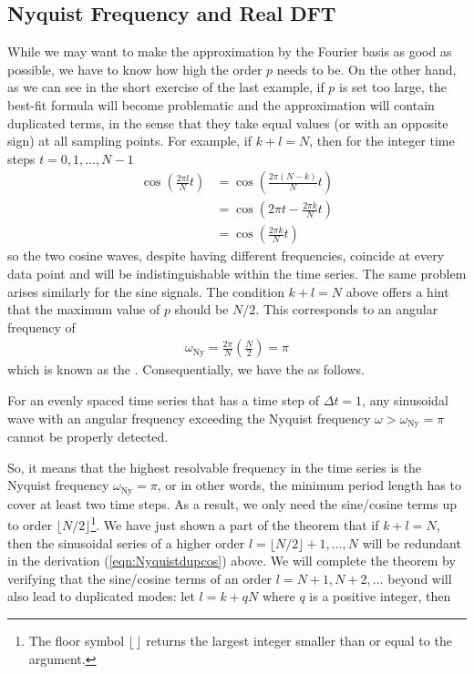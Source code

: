 \subsection{Nyquist Frequency and Real DFT}

While we may want to make the approximation by the Fourier basis as good as possible, we have to know how high the order $p$ needs to be. On the other hand, as we can see in the short exercise of the last example, if $p$ is set too large, the best-fit formula will become problematic and the approximation will contain duplicated terms, in the sense that they take equal values (or with an opposite sign) at all sampling points. For example, if $k + l = N$, then for the integer time steps $t = 0, 1, \ldots, N-1$
\begin{align}
\cos(\frac{2\pi l}{N} t) &= \cos(\frac{2\pi (N-k)}{N} t) \nonumber \\
&= \cos(2\pi t - \frac{2\pi k}{N} t) \nonumber \\
&= \cos(\frac{2\pi k}{N} t) \label{eqn:Nyquistdupcos}
\end{align}
so the two cosine waves, despite having different frequencies, coincide at every data point and will be indistinguishable within the time series. The same problem arises similarly for the sine signals. The condition $k + l = N$ above offers a hint that the maximum value of $p$ should be $N/2$. This corresponds to an angular frequency of 
\begin{align}
\omega_{\text{Ny}} = \frac{2\pi}{N}\left(\frac{N}{2}\right) = \pi    
\end{align}
which is known as the . Consequentially, we have the  as follows.
\begin{thm}
\label{thm:Nyquist}
For an evenly spaced time series that has a time step of $\Delta t = 1$, any sinusoidal wave with an angular frequency exceeding the Nyquist frequency $\omega > \omega_{\text{Ny}} = \pi$ cannot be properly detected. 
\end{thm}
So, it means that the highest resolvable frequency in the time series is the Nyquist frequency $\omega_{\text{Ny}} = \pi$, or in other words, the minimum period length has to cover at least two time steps. As a result, we only need the sine/cosine terms up to order $\lfloor N/2 \rfloor$\footnote{The floor symbol $\lfloor \, \rfloor$ returns the largest integer smaller than or equal to the argument.}. We have just shown a part of the theorem that if $k + l = N$, then the sinusoidal series of a higher order $l = \lfloor N/2 \rfloor + 1, \ldots, N$ will be redundant in the derivation (\ref{eqn:Nyquistdupcos}) above. We will complete the theorem by verifying that the sine/cosine terms of an order $l = N+1, N+2, \ldots$ beyond will also lead to duplicated modes: let $l = k + qN$ where $q$ is a positive integer, then
